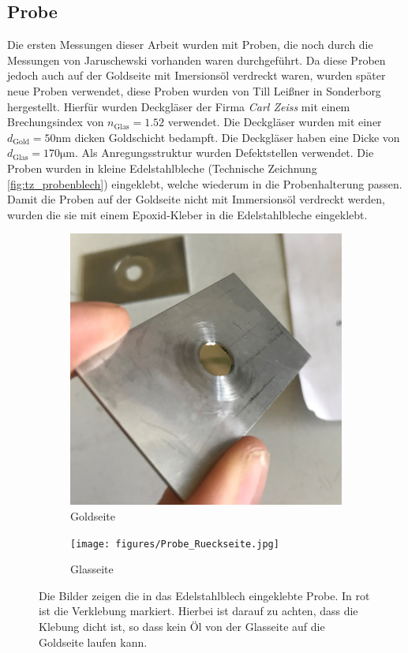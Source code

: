 \documentclass[titlepage]{article}
\begin{document}
	\subsection{Probe}
	Die ersten Messungen dieser Arbeit wurden mit Proben, die noch durch die Messungen von Jaruschewski \cite{Jaruschewski.2020} vorhanden waren durchgeführt. Da diese Proben jedoch auch auf der Goldseite mit Imersionsöl verdreckt waren, wurden später neue Proben verwendet, diese Proben wurden von Till Leißner in Sonderborg hergestellt. Hierfür wurden Deckgläser der Firma \textit{Carl Zeiss} mit einem Brechungsindex von $n_{\mathrm{Glas}}= 1.52$ verwendet. Die Deckgläser wurden mit einer $d_{\mathrm{Gold}} = 50\mathrm{nm}$ dicken Goldschicht bedampft. Die Deckgläser haben eine Dicke von $d_{\mathrm{Glas}} = 170 \mathrm{\mu m}$. Als Anregungsstruktur wurden Defektstellen verwendet. Die Proben wurden in kleine Edelstahlbleche (Technische Zeichnung \ref{fig:tz_probenblech}) eingeklebt, welche wiederum in die Probenhalterung passen. Damit die Proben auf der Goldseite nicht mit Immersionsöl verdreckt werden, wurden die sie mit einem Epoxid-Kleber in die Edelstahlbleche eingeklebt.
	\begin{figure}
		\centering
		\begin{subfigure}[b]{0.4\textwidth}
			\centering
			\includegraphics[width=\textwidth]{figures/Probe_Vorderseite.jpg}
			\caption{Goldseite}
			\label{fig:probe_vorderseite}
		\end{subfigure}
		\hfill
		\begin{subfigure}[b]{0.4\textwidth}
			\centering
			\texttt{[image: figures/Probe\_Rueckseite.jpg]}
			\caption{Glasseite}
			\label{fig:probe_rueckseite}
		\end{subfigure}
		\caption{Die Bilder zeigen die in das Edelstahlblech eingeklebte Probe. In rot ist die Verklebung markiert. Hierbei ist darauf zu achten, dass die Klebung dicht ist, so dass kein Öl von der Glasseite auf die Goldseite laufen kann.}
		\label{fig:probe}
	\end{figure}
\end{document}
